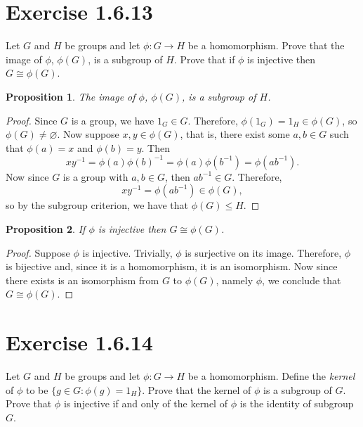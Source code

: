 \documentclass[12pt]{article}
\newtheorem{proposition}{Proposition}
\newenvironment{problem}
    {\begin{lrbox}{\mybox}\begin{minipage}{\textwidth-10pt}}
    {\end{minipage}\end{lrbox}\framebox[6.5in]{\usebox{\mybox}}}
\let\emptyset\varnothing
\begin{document}
\section*{Exercise 1.6.13}
\begin{problem}
    Let $G$ and $H$ be groups and let $\phi:G\to H$ be a homomorphism. Prove that the image of $\phi$, $\phi(G)$, is a subgroup of $H$. Prove that if $\phi$ is injective then $G\cong \phi(G)$.
\end{problem}

\begin{proposition}
    The image of $\phi$, $\phi(G)$, is a subgroup of $H$.
\end{proposition}
    
\begin{proof}
    Since $G$ is a group, we have $1_G\in G$. Therefore, $\phi(1_G)=1_H\in\phi(G)$, so $\phi(G)\ne\emptyset$. Now suppose $x,y\in\phi(G)$, that is, there exist some $a,b\in G$ such that $\phi(a)=x$ and $\phi(b)=y$. Then
    \[xy^{-1} = \phi(a)\phi(b)^{-1}=\phi(a)\phi(b^{-1}) = \phi(ab^{-1}).\]
    Now since $G$ is a group with $a,b\in G$, then $ab^{-1}\in G$. Therefore,
    \[xy^{-1} = \phi(ab^{-1}) \in \phi(G),\]
    so by the subgroup criterion, we have that $\phi(G)\leq H$.
    
\end{proof}

\begin{proposition}
    If $\phi$ is injective then $G\cong \phi(G)$.
\end{proposition}

\begin{proof}
    Suppose $\phi$ is injective. Trivially, $\phi$ is surjective on its image. Therefore, $\phi$ is bijective and, since it is a homomorphism, it is an isomorphism. Now since there exists is an isomorphism from $G$ to $\phi(G)$, namely $\phi$, we conclude that $G\cong\phi(G)$.
    
\end{proof}

\section*{Exercise 1.6.14}
\begin{problem}
    Let $G$ and $H$ be groups and let $\phi:G\to H$ be a homomorphism. Define the \emph{kernel} of $\phi$ to be $\{g\in G : \phi(g) = 1_H\}$. Prove that the kernel of $\phi$ is a subgroup of $G$. Prove that $\phi$ is injective if and only of the kernel of $\phi$ is the identity of subgroup $G$.
\end{problem}
\end{document}
